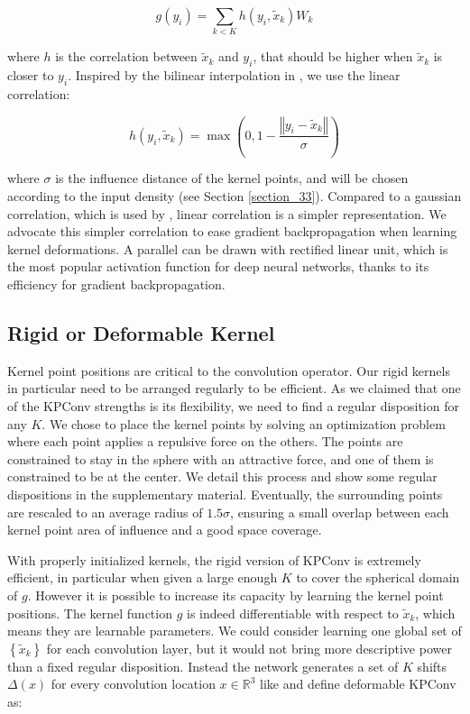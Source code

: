 \documentclass[10pt,twocolumn,letterpaper]{article}
\begin{document}
\begin{equation} \label{eq:2}
    g(y_i) = \sum_{k<K} h\left(y_i,  \widetilde{x}_k\right) W_k
\end{equation}

\noindent
where $h$ is the correlation between $\widetilde{x}_k$ and $y_i$, that should be higher when $\widetilde{x}_k$ is closer to $y_i$. Inspired by the bilinear interpolation in \cite{dai2017deformable}, we use the linear correlation:

\begin{equation} \label{eq:3}
    h\left(y_i,  \widetilde{x}_k\right) = \max\left(0, 1 - \frac{\left\Vert y_i - \widetilde{x}_k \right\Vert}{\sigma}\right)
\end{equation}

\noindent
where $\sigma$ is the influence distance of the kernel points, and will be chosen according to the input density (see Section \ref{section_33}). Compared to a gaussian correlation, which is used by \cite{atzmon2018point}, linear correlation is a simpler representation. We advocate this simpler correlation to ease gradient backpropagation when learning kernel deformations. A parallel can be drawn with rectified linear unit, which is the most popular activation function for deep neural networks, thanks to its efficiency for gradient backpropagation.

\subsection{Rigid or Deformable Kernel}

Kernel point positions are critical to the convolution operator. Our rigid kernels in particular need to be arranged regularly to be efficient. As we claimed that one of the KPConv strengths is its flexibility, we need to find a regular disposition for any $K$. We chose to place the kernel points by solving an optimization problem where each point applies a repulsive force on the others. The points are constrained to stay in the sphere with an attractive force, and one of them is constrained to be at the center. We detail this process and show some regular dispositions in the supplementary material. Eventually, the surrounding points are rescaled to an average radius of $1.5\sigma$, ensuring a small overlap between each kernel point area of influence and a good space coverage.

With properly initialized kernels, the rigid version of KPConv is extremely efficient, in particular when given a large enough $K$ to cover the spherical domain of $g$. However it is possible to increase its capacity by learning the kernel point positions. The kernel function $g$ is indeed differentiable with respect to $\widetilde{x}_k$, which means they are learnable parameters. We could consider learning one global set of $\left\lbrace\widetilde{x}_k\right\rbrace$ for each convolution layer, but it would not bring more descriptive power than a fixed regular disposition. Instead the network generates a set of $K$ shifts $\Delta(x)$ for every convolution location $x \in \mathbb{R}^3$ like \cite{dai2017deformable} and define deformable KPConv as:
\end{document}

